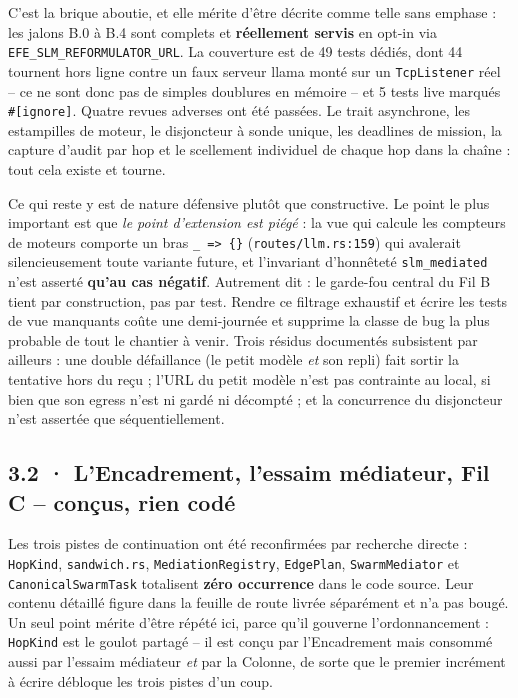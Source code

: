 \documentclass[10pt]{article}
\newcommand{\code}[1]{\texttt{\small #1}}
\begin{document}
C'est la brique aboutie, et elle mérite d'être décrite comme telle sans emphase : les jalons B.0 à B.4
sont complets et \textbf{réellement servis} en opt-in via \code{EFE\_SLM\_REFORMULATOR\_URL}. La
couverture est de 49 tests dédiés, dont 44 tournent hors ligne contre un faux serveur llama monté sur
un \code{TcpListener} réel -- ce ne sont donc pas de simples doublures en mémoire -- et 5 tests live
marqués \code{\#[ignore]}. Quatre revues adverses ont été passées. Le trait asynchrone, les estampilles
de moteur, le disjoncteur à sonde unique, les deadlines de mission, la capture d'audit par hop et le
scellement individuel de chaque hop dans la chaîne : tout cela existe et tourne.

Ce qui reste y est de nature défensive plutôt que constructive. Le point le plus important est que
\emph{le point d'extension est piégé} : la vue qui calcule les compteurs de moteurs comporte un bras
\code{\_ => \{\}} (\code{routes/llm.rs:159}) qui avalerait silencieusement toute variante future, et
l'invariant d'honnêteté \code{slm\_mediated} n'est asserté \textbf{qu'au cas négatif}. Autrement dit :
le garde-fou central du Fil B tient par construction, pas par test. Rendre ce filtrage exhaustif et
écrire les tests de vue manquants coûte une demi-journée et supprime la classe de bug la plus probable
de tout le chantier à venir. Trois résidus documentés subsistent par ailleurs : une double défaillance
(le petit modèle \emph{et} son repli) fait sortir la tentative hors du reçu ; l'URL du petit modèle
n'est pas contrainte au local, si bien que son egress n'est ni gardé ni décompté ; et la concurrence
du disjoncteur n'est assertée que séquentiellement.

\subsection{3.2 · L'Encadrement, l'essaim médiateur, Fil C -- conçus, rien codé}

Les trois pistes de continuation ont été reconfirmées par recherche directe : \code{HopKind},
\code{sandwich.rs}, \code{MediationRegistry}, \code{EdgePlan}, \code{SwarmMediator} et
\code{CanonicalSwarmTask} totalisent \textbf{zéro occurrence} dans le code source. Leur contenu détaillé
figure dans la feuille de route livrée séparément et n'a pas bougé. Un seul point mérite d'être répété
ici, parce qu'il gouverne l'ordonnancement : \code{HopKind} est le goulot partagé -- il est conçu par
l'Encadrement mais consommé aussi par l'essaim médiateur \emph{et} par la Colonne, de sorte que le
premier incrément à écrire débloque les trois pistes d'un coup.
\end{document}
